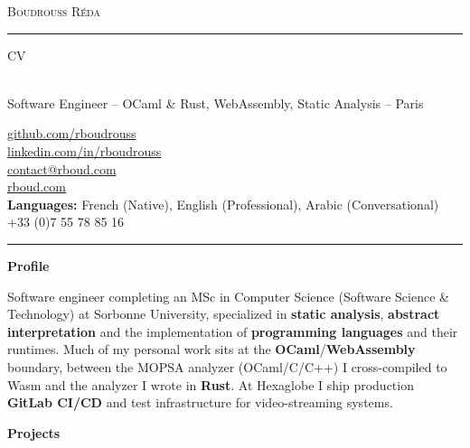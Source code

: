 \documentclass[10pt,A4]{article}
\newcommand{\cvsection}[1]
{
	\begin{center}
		\large\textcolor{sectcol}{\textbf{#1}}
	\end{center}
}
\newcommand{\metasection}[2]
{
\footnotesize{#2} \hspace*{\fill} \footnotesize{#1}\\[1pt]
}
\begin{document}
\pagestyle{fancy}


\vspace{-8pt}
\begin{center}
    {\HUGE \textsc{Boudrouss Réda} \textcolor{sectcol}{\rule[-1mm]{1mm}{0.9cm}} \textsc{CV}}\\[2pt]
    {\small Software Engineer -- OCaml \& Rust, WebAssembly, Static Analysis -- Paris}
\end{center}

\vspace{6pt}

\metasection{\href{https://github.com/rboudrouss}{github.com/rboudrouss}}{}
\metasection{\href{https://www.linkedin.com/in/rboudrouss}{linkedin.com/in/rboudrouss}}{}
\metasection{\href{mailto:contact@rboud.com}{contact@rboud.com}}{}
\metasection{\href{https://rboud.com}{rboud.com}}{}
\metasection{+33 (0)7 55 78 85 16}{\textbf{Languages:} French (Native), English (Professional), Arabic (Conversational)}

\vspace{-15pt}
\textcolor{softcol}{\hrule}

\normalsize

\cvsection{Profile}
Software engineer completing an MSc in Computer Science (Software Science \& Technology) at Sorbonne University, specialized in \textbf{static analysis}, \textbf{abstract interpretation} and the implementation of \textbf{programming languages} and their runtimes. Much of my personal work sits at the \textbf{OCaml}/\textbf{WebAssembly} boundary, between the MOPSA analyzer (OCaml/C/C++) I cross-compiled to Wasm and the analyzer I wrote in \textbf{Rust}. At Hexaglobe I ship production \textbf{GitLab CI/CD} and test infrastructure for video-streaming systems.

\cvsection{Projects}
\end{document}

